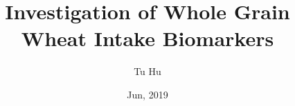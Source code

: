 \documentclass[]{article}
\title{Investigation of Whole Grain Wheat Intake Biomarkers}
\author{Tu Hu}
\subtitle{}
\begin{document}
\maketitle
\date{Jun, 2019}
\begin{abstract}

\end{abstract}

\section{}
\end{document}
